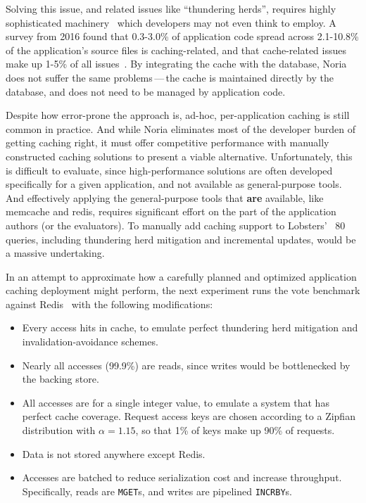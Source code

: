 Solving this issue, and related issues like ``thundering herds'', requires
highly sophisticated machinery~\cite{facebook-memcache, transactional-cache,
orm-cache, sql-cache} which developers may not even think to employ. A survey
from 2016 found that 0.3-3.0\% of application code spread across 2.1-10.8\% of
the application's source files is caching-related, and that cache-related issues
make up 1-5\% of all issues~\cite{caching-is-hard}. By integrating the cache
with the database, Noria does not suffer the same problems\,---\,the cache is
maintained directly by the database, and does not need to be managed by
application code.

Despite how error-prone the approach is, ad-hoc, per-application caching is
still common in practice. And while Noria eliminates most of the developer
burden of getting caching right, it must offer competitive performance with
manually constructed caching solutions to present a viable alternative.
Unfortunately, this is difficult to evaluate, since high-performance solutions
are often developed specifically for a given application, and not available as
general-purpose tools. And effectively applying the general-purpose tools that
\textbf{are} available, like memcache and redis, requires significant effort on
the part of the application authors (or the evaluators). To manually add caching
support to Lobsters' ~80 queries, including thundering herd mitigation and
incremental updates, would be a massive undertaking.

In an attempt to approximate how a carefully planned and optimized application
caching deployment might perform, the next experiment runs the vote benchmark
against Redis~\cite{redis} with the following modifications:

\begin{itemize}
 \item Every access hits in cache, to emulate perfect thundering herd mitigation
   and invalidation-avoidance schemes.
 \item Nearly all accesses (99.9\%) are reads, since writes would be
   bottlenecked by the backing store.
 \item All accesses are for a single integer value, to emulate a system that has
   perfect cache coverage. Request access keys are chosen according to a Zipfian
    distribution with $\alpha = 1.15$, so that 1\% of keys make up 90\% of
    requests.
 \item Data is not stored anywhere except Redis.
 \item Accesses are batched to reduce serialization cost and increase
   throughput. Specifically, reads are \texttt{MGET}s, and writes are pipelined
    \texttt{INCRBY}s.
\end{itemize}

